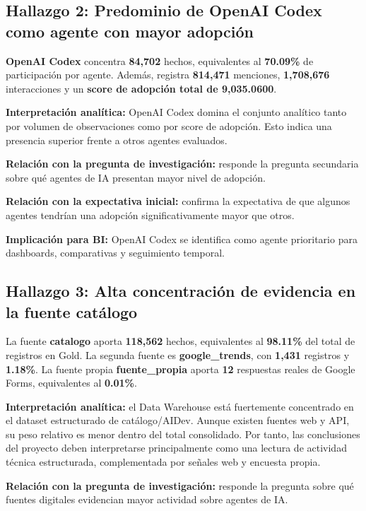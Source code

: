 \documentclass[12pt,a4paper]{article}
\begin{document}
\subsection*{Hallazgo 2: Predominio de OpenAI Codex como agente con mayor adopci\'on}

\textbf{OpenAI Codex} concentra \textbf{84,702} hechos, equivalentes al \textbf{70.09\%} de participaci\'on por agente. Adem\'as, registra \textbf{814,471} menciones, \textbf{1,708,676} interacciones y un \textbf{score de adopci\'on total de 9,035.0600}.

\textbf{Interpretaci\'on anal\'itica:} OpenAI Codex domina el conjunto anal\'itico tanto por volumen de observaciones como por score de adopci\'on. Esto indica una presencia superior frente a otros agentes evaluados.

\textbf{Relaci\'on con la pregunta de investigaci\'on:} responde la pregunta secundaria sobre qu\'e agentes de IA presentan mayor nivel de adopci\'on.

\textbf{Relaci\'on con la expectativa inicial:} confirma la expectativa de que algunos agentes tendr\'ian una adopci\'on significativamente mayor que otros.

\textbf{Implicaci\'on para BI:} OpenAI Codex se identifica como agente prioritario para dashboards, comparativas y seguimiento temporal.

\subsection*{Hallazgo 3: Alta concentraci\'on de evidencia en la fuente cat\'alogo}

La fuente \textbf{catalogo} aporta \textbf{118,562} hechos, equivalentes al \textbf{98.11\%} del total de registros en Gold. La segunda fuente es \textbf{google\_trends}, con \textbf{1,431} registros y \textbf{1.18\%}. La fuente propia \textbf{fuente\_propia} aporta \textbf{12} respuestas reales de Google Forms, equivalentes al \textbf{0.01\%}.

\textbf{Interpretaci\'on anal\'itica:} el Data Warehouse est\'a fuertemente concentrado en el dataset estructurado de cat\'alogo/AIDev. Aunque existen fuentes web y API, su peso relativo es menor dentro del total consolidado. Por tanto, las conclusiones del proyecto deben interpretarse principalmente como una lectura de actividad t\'ecnica estructurada, complementada por se\~nales web y encuesta propia.

\textbf{Relaci\'on con la pregunta de investigaci\'on:} responde la pregunta sobre qu\'e fuentes digitales evidencian mayor actividad sobre agentes de IA.
\end{document}
